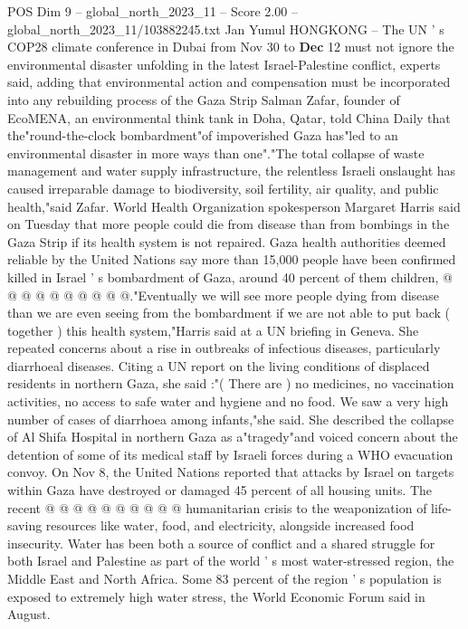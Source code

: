 \begin{textsample}{POS Dim 9 – global\_north\_2023\_11 – Score 2.00 – global\_north\_2023\_11/103882245.txt}  \label{ex:f9_pos_153}
Jan Yumul HONGKONG -- The UN ' s COP28 climate conference in Dubai from Nov 30 to \textbf{Dec} 12 must not ignore the environmental disaster unfolding in the latest Israel-Palestine conflict, experts said, adding that environmental action and compensation must be incorporated into any rebuilding process of the Gaza Strip Salman Zafar, founder of EcoMENA, an environmental think tank in Doha, Qatar, told China Daily that the"round-the-clock bombardment"of impoverished Gaza has"led to an environmental disaster in more ways than one"."The total collapse of waste management and water supply infrastructure, the relentless Israeli onslaught has caused irreparable damage to biodiversity, soil fertility, air quality, and public health,"said Zafar.
World Health Organization spokesperson Margaret Harris said on Tuesday that more people could die from disease than from bombings in the Gaza Strip if its health system is not repaired.
Gaza health authorities deemed reliable by the United Nations say more than 15,000 people have been confirmed killed in Israel ' s bombardment of Gaza, around 40 percent of them children, @ @ @ @ @ @ @ @ @ @."Eventually we will see more people dying from disease than we are even seeing from the bombardment if we are not able to put back ( together ) this health system,"Harris said at a UN briefing in Geneva.
She repeated concerns about a rise in outbreaks of infectious diseases, particularly diarrhoeal diseases.
Citing a UN report on the living conditions of displaced residents in northern Gaza, she said :"( There are ) no medicines, no vaccination activities, no access to safe water and hygiene and no food.
We saw a very high number of cases of diarrhoea among infants,"she said.
She described the collapse of Al Shifa Hospital in northern Gaza as a"tragedy"and voiced concern about the detention of some of its medical staff by Israeli forces during a WHO evacuation convoy.
On Nov 8, the United Nations reported that attacks by Israel on targets within Gaza have destroyed or damaged 45 percent of all housing units.
The recent @ @ @ @ @ @ @ @ @ @ humanitarian crisis to the weaponization of life-saving resources like water, food, and electricity, alongside increased food insecurity.
Water has been both a source of conflict and a shared struggle for both Israel and Palestine as part of the world ' s most water-stressed region, the Middle East and North Africa.
Some 83 percent of the region ' s population is exposed to extremely high water stress, the World Economic Forum said in August.

\end{textsample}
